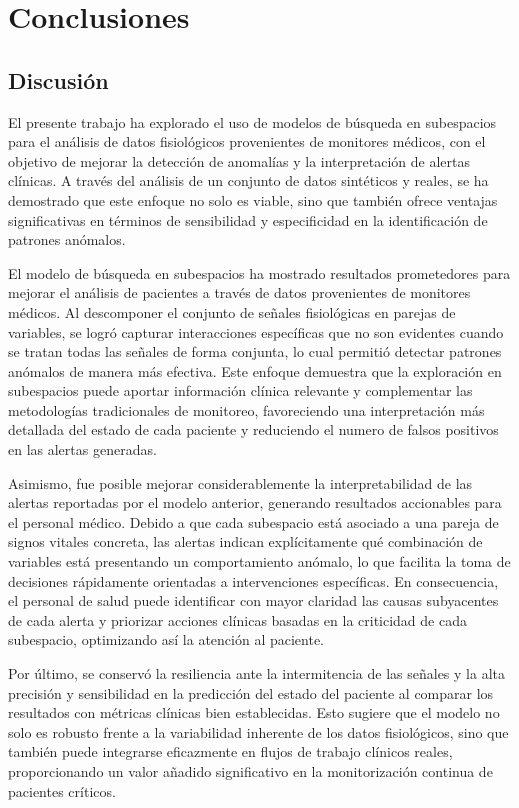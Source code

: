 \chapter{Conclusiones}

\section{Discusión}

El presente trabajo ha explorado el uso de modelos de búsqueda en subespacios para el análisis de datos fisiológicos provenientes de monitores médicos, con el objetivo de mejorar la detección de anomalías y la interpretación de alertas clínicas. A través del análisis de un conjunto de datos sintéticos y reales, se ha demostrado que este enfoque no solo es viable, sino que también ofrece ventajas significativas en términos de sensibilidad y especificidad en la identificación de patrones anómalos.

El modelo de búsqueda en subespacios ha mostrado resultados prometedores para mejorar el análisis de pacientes a través de datos provenientes de monitores médicos. Al descomponer el conjunto de señales fisiológicas en parejas de variables, se logró capturar interacciones específicas que no son evidentes cuando se tratan todas las señales de forma conjunta, lo cual permitió detectar patrones anómalos de manera más efectiva. Este enfoque demuestra que la exploración en subespacios puede aportar información clínica relevante y complementar las metodologías tradicionales de monitoreo, favoreciendo una interpretación más detallada del estado de cada paciente y reduciendo el numero de falsos positivos en las alertas generadas.

Asimismo, fue posible mejorar considerablemente la interpretabilidad de las alertas reportadas por el modelo anterior, generando resultados accionables para el personal médico. Debido a que cada subespacio está asociado a una pareja de signos vitales concreta, las alertas indican explícitamente qué combinación de variables está presentando un comportamiento anómalo, lo que facilita la toma de decisiones rápidamente orientadas a intervenciones específicas. En consecuencia, el personal de salud puede identificar con mayor claridad las causas subyacentes de cada alerta y priorizar acciones clínicas basadas en la criticidad de cada subespacio, optimizando así la atención al paciente.

Por último, se conservó la resiliencia ante la intermitencia de las señales y la alta precisión y sensibilidad en la predicción del estado del paciente al comparar los resultados con métricas clínicas bien establecidas. Esto sugiere que el modelo no solo es robusto frente a la variabilidad inherente de los datos fisiológicos, sino que también puede integrarse eficazmente en flujos de trabajo clínicos reales, proporcionando un valor añadido significativo en la monitorización continua de pacientes críticos.

